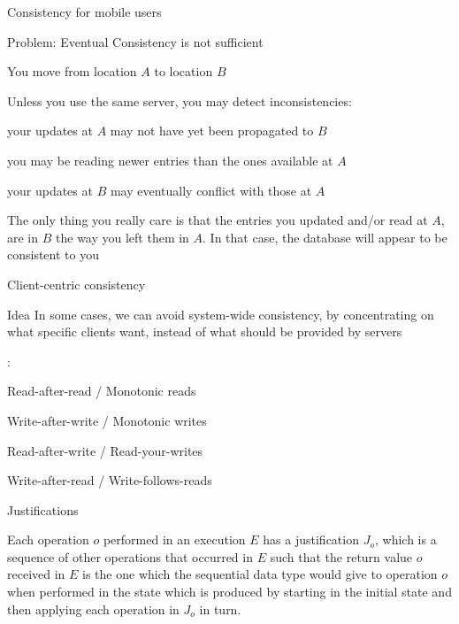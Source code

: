 
\begin{frame}{Consistency for mobile users}
\begin{block}{Problem: Eventual Consistency is not sufficient}
\BI
\item You move from location $A$ to location $B$
\item Unless you use the same server, you may detect inconsistencies:
\BI
\item your updates at $A$ may not have yet been propagated to $B$
\item you may be reading newer entries than the ones available at $A$
\item your updates at $B$ may eventually conflict with those at $A$
\EI
\EI
\end{block}

\bigskip
{}

The only thing you really care is that the entries you updated and/or read at
$A$, are in $B$ the way you left them in $A$. In that case, the database will
appear to be consistent to \alert{you}
\end{frame}

\begin{frame}{Client-centric consistency}

\begin{block}{Idea}
In some cases, we can avoid system-wide consistency, by concentrating on what
specific clients want, instead of what should be provided by servers
\end{block}

\bigskip
{}:
\BI
\item Read-after-read / Monotonic reads
\item Write-after-write / Monotonic writes
\item Read-after-write / Read-your-writes
\item Write-after-read / Write-follows-reads
\EI

\end{frame}

\begin{frame}{Justifications}
\begin{definition}[Justification]
Each operation $o$ performed in an execution $E$ has a \alert{justification}
$J_o$, which is a sequence of other operations that occurred in $E$ such
that the return value $o$ received in $E$ is the one which the sequential data type would 
give to operation $o$ when performed in the state which is produced
by starting in the initial state and then applying each operation in $J_o$ in
turn.
\end{definition}
\end{frame}



